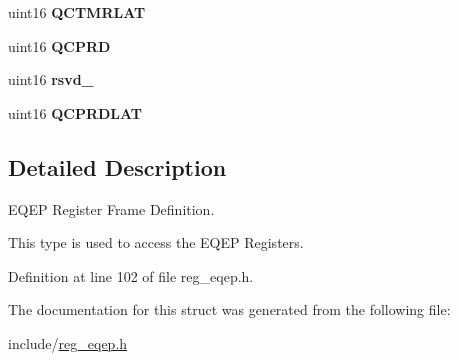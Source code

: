 \begin{DoxyCompactItemize}
uint16 {\bfseries Q\+C\+T\+M\+R\+L\+AT}
\item 
\mbox{\label{structeqepBASE_a649c495341e2b5cde8dea507b598bca8}} 
uint16 {\bfseries Q\+C\+P\+RD}
\item 
\mbox{\label{structeqepBASE_a2b2f184ca5f298dc62c0dcd2e3a1ba62}} 
uint16 {\bfseries rsvd\+\_}
\item 
\mbox{\label{structeqepBASE_ab0cb60eb1bd29e9f9e7e0b4c26d11890}} 
uint16 {\bfseries Q\+C\+P\+R\+D\+L\+AT}
\end{DoxyCompactItemize}


\subsection{Detailed Description}
E\+Q\+EP Register Frame Definition. 

This type is used to access the E\+Q\+EP Registers. 

Definition at line 102 of file reg\+\_\+eqep.\+h.



The documentation for this struct was generated from the following file\+:\begin{DoxyCompactItemize}
\item 
include/\mbox{\hyperlink{reg__eqep_8h}{reg\+\_\+eqep.\+h}}\end{DoxyCompactItemize}
